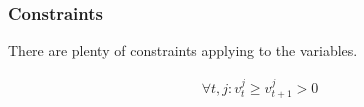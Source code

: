 \subsubsection{Constraints}
There are plenty of constraints applying to the variables.

\begin{align*}
    \forall t, j: v_{t}^{j} \geq v_{t+1}^{j} > 0
\end{align*}









































